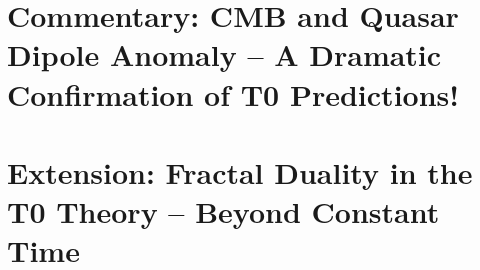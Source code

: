\documentclass[11pt,oneside]{book}
\begin{document}
	\chapter{Commentary: CMB and Quasar Dipole Anomaly -- A Dramatic Confirmation of T0 Predictions!}
	
	
	\chapter{Extension: Fractal Duality in the T0 Theory – Beyond Constant Time}
	
	
\end{document}
